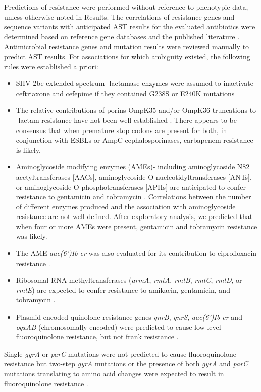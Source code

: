 Predictions of resistance were performed without reference to phenotypic data, unless otherwise noted in Results. The correlations of resistance genes and sequence variants with anticipated AST results for the evaluated antibiotics were determined based on reference gene databases and the published literature \citep{Bush2010-lg, Bush1995-rb, Jacoby2009-wr, Naas2008-vx, Evans2014-md, Zhang2014-xg, Feng-Jui2003-nf, Vetting2011-iu, Kim2009-me, Ramirez2010-sv, Galimand2012-gu, Liakopoulos2016-wl, Tarnberg2009-qg, Bonnet2004-xz, Roberts2005-js, Fevre2005-vm, Fu2013-cm, Poirel2010-ch}. Antimicrobial resistance genes and mutation results were reviewed manually to predict AST results. For associations for which ambiguity existed, the following rules were established a priori:
\begin{itemize}
  \item SHV 2be extended-spectrum {\textbeta}-lactamase enzymes were assumed to inactivate ceftriaxone and cefepime if they contained G238S or E240K mutations \citep{Liakopoulos2016-wl, Howard_Christopher2002-tr}
  \item The relative contributions of porins OmpK35 and/or OmpK36 truncations to {\textbeta}-lactam resistance have not been well established \citep{Zhang2014-xg, Shelburne2017-dm, Tsai2011-ly, Landman2009-gi, Jiang2009-hg, Domenech-Sanchez2003-fv}. There appears to be consensus that when premature stop codons are present for both, in conjunction with ESBLs or AmpC cephalosporinases, carbapenem resistance is likely.
  \item Aminoglycoside modifying enzymes (AMEs)- including aminoglycoside N82 acetyltransferases [AACs], aminoglycoside O-nucleotidyltransferases [ANTs], or aminoglycoside O-phosphotransferases [APHs] are anticipated to confer resistance to gentamicin and tobramycin \citep{Ramirez2010-sv}. Correlations between the number of different enzymes produced and the association with aminoglycoside resistance are not well defined. After exploratory analysis, we predicted that when four or more AMEs were present, gentamicin and tobramycin resistance was likely.
  \item The AME \textit{aac(6’)Ib-cr} was also evaluated for its contribution to ciprofloxacin resistance \citep{Ramirez2010-sv}.
  \item Ribosomal RNA methyltransferases (\textit{armA}, \textit{rmtA}, \textit{rmtB}, \textit{rmtC}, \textit{rmtD}, or \textit{rmtE}) are expected to confer resistance to amikacin, gentamicin, and tobramycin \citep{Galimand2012-gu}.
  \item Plasmid-encoded quinolone resistance genes \textit{qnrB}, \textit{qnrS}, \textit{aac(6’)Ib-cr} and \textit{oqxAB} (chromosomally encoded) were predicted to cause low-level fluoroquinolone resistance, but not frank resistance \citep{Kim2009-me, Ruiz2012-cx, Jacoby2005-xm}.
\end{itemize}
Single \textit{gyrA} or \textit{parC} mutations were not predicted to cause fluoroquinolone resistance but two-step \textit{gyrA} mutations or the presence of both \textit{gyrA} and \textit{parC} mutations translating to amino acid changes were expected to result in fluoroquinolone resistance \citep{Ruiz2012-cx, Jacoby2005-xm}.


